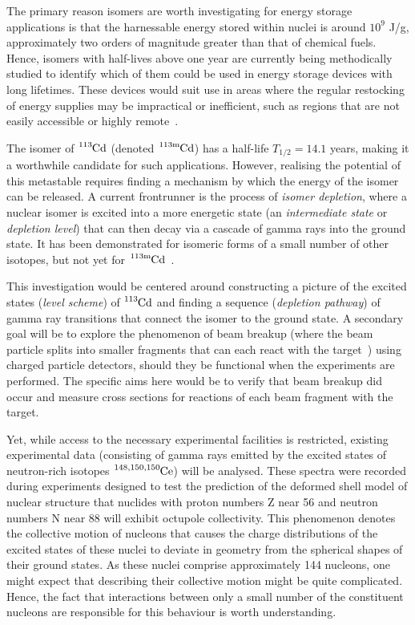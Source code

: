 \documentclass[12pt,a4paper]{article}
\newcommand{\cdm}{\ce{^{113\text{m}}Cd}}
\begin{document}
\medskip
\noindent
The primary reason isomers are worth investigating for energy storage applications is that the harnessable energy stored within nuclei is around $10^9$ J/g, approximately two orders of magnitude greater than that of chemical fuels.
Hence, isomers with half-lives above one year are currently being methodically studied to identify which of them could be used in energy storage devices with long lifetimes.
These devices would suit use in areas where the regular restocking of energy supplies may be impractical or inefficient, such as regions that are not easily accessible or highly remote~\cite{shaffer_innovations_2018}.

\medskip
\noindent
The isomer of $\ce{^{113}Cd}$ (denoted $\cdm$) has a half-life $T_{1/2} = 14.1$ years, making it a worthwhile candidate for such applications.
However, realising the potential of this metastable requires finding a mechanism by which the energy of the isomer can be released.
A current frontrunner is the process of \textit{isomer depletion}, where a nuclear isomer is excited into a more energetic state (an \textit{intermediate state} or \textit{depletion level}) that can then decay via a cascade of gamma rays into the ground state.
It has been demonstrated for isomeric forms of a small number of other isotopes, but not yet for $\cdm$~\cite{shaffer_innovations_2018}.

\medskip
\noindent
This investigation would be centered around constructing a picture of the excited states (\textit{level scheme}) of $\ce{^{113}Cd}$ and finding a sequence (\textit{depletion pathway}) of gamma ray transitions that connect the isomer to the ground state.
A secondary goal will be to explore the phenomenon of beam breakup (where the beam particle splits into smaller fragments that can each react with the target~\cite{curtis_+li_2005,dasgupta_fusion_1999}) using charged particle detectors, should they be functional when the experiments are performed.
The specific aims here would be to verify that beam breakup did occur and measure cross sections for reactions of each beam fragment with the target.


\medskip
\noindent
Yet, while access to the necessary experimental facilities is restricted, existing experimental data (consisting of gamma rays emitted by the excited states of neutron-rich isotopes $\ce{^{148,150,150}Ce}$) will be analysed.
These spectra were recorded during experiments designed to test the prediction of the deformed shell model of nuclear structure that nuclides with proton numbers Z near 56 and neutron numbers N near 88 will exhibit octupole collectivity.
This phenomenon denotes the collective motion of nucleons that causes the charge distributions of the excited states of these nuclei to deviate in geometry from the spherical shapes of their ground states.
As these nuclei comprise approximately 144 nucleons, one might expect that describing their collective motion might be quite complicated.
Hence, the fact that interactions between only a small number of the constituent nucleons are responsible for this behaviour is worth understanding.
\end{document}
